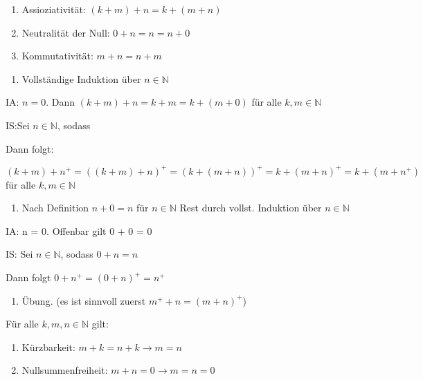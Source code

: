 \documentclass{../../meta/tudscript}
\begin{document}
\begin{enumerate}
\def\labelenumi{\arabic{enumi}.}
\item
  Assioziativität: \((k + m) + n = k + (m + n)\)
\item
  Neutralität der Null: \(0 + n = n = n + 0\)
\item
  Kommutativität: \(m + n = n + m\)
\end{enumerate}



\begin{enumerate}
\def\labelenumi{\arabic{enumi}.}

\item
  Vollständige Induktion über \(n \in \mathbb{N}\)
\end{enumerate}

IA: \(n = 0\). Dann \((k + m) + n = k + m = k + (m + 0)\) für alle
\(k,m \in \mathbb{N}\)

IS:Sei \(n \in \mathbb{N}\), sodass

Dann folgt:

\((k + m) + n^+ = ((k + m) + n)^+ = (k + (m + n))^+ = k + (m + n)^+ = k + (m + n^+)\)
für alle \(k,m \in \mathbb{N}\)

\begin{enumerate}
\def\labelenumi{\arabic{enumi}.}
\setcounter{enumi}{1}

\item
  Nach Definition \(n+ 0 = n\) für \(n \in \mathbb{N}\) Rest durch
  vollst. Induktion über \(n \in \mathbb{N}\)
\end{enumerate}

IA: n = 0. Offenbar gilt 0 + 0 = 0

IS: Sei \(n \in \mathbb{N}\), sodass \(0+n=n\)

Dann folgt \(0+n^+ = (0+n)^+ = n^+\)

\begin{enumerate}
\def\labelenumi{\arabic{enumi}.}
\setcounter{enumi}{2}

\item
  Übung. (es ist sinnvoll zuerst \(m^+ + n = (m+n)^+\))
\end{enumerate}



Für alle \(k,m,n \in \mathbb{N}\) gilt:

\begin{enumerate}
\def\labelenumi{\arabic{enumi}.}
\item
  Kürzbarkeit: \(m + k = n + k \rightarrow m = n\)
\item
  Nullsummenfreiheit: \(m + n = 0 \rightarrow m = n = 0\)
\end{enumerate}
\end{document}
